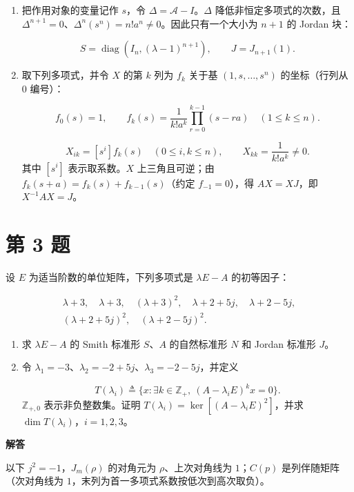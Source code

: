 \documentclass[UTF8,10pt,letterpaper,fontset=fandol]{ctexart}
\begin{document}
\begin{enumerate}
\item 把作用对象的变量记作 $s$，令 $\Delta=\mathcal A-I$。$\Delta$ 降低非恒定多项式的次数，且 $\Delta^{n+1}=0$、$\Delta^n(s^n)=n!a^n\ne0$。因此只有一个大小为 $n+1$ 的 Jordan 块：

\[
\boxed{S=\operatorname{diag}(I_n,(\lambda-1)^{n+1}),\qquad J=J_{n+1}(1)}.
\]

\item 取下列多项式，并令 $X$ 的第 $k$ 列为 $f_k$ 关于基 $(1,s,\ldots,s^n)$ 的坐标（行列从 $0$ 编号）：

\[
f_0(s)=1,\qquad
f_k(s)=\frac{1}{k!a^k}\prod_{r=0}^{k-1}(s-ra)\quad(1\le k\le n).
\]

\[
\boxed{X_{ik}=[s^i]f_k(s)\quad(0\le i,k\le n)},\qquad
X_{kk}=\frac{1}{k!a^k}\ne0.
\]
其中 $[s^i]$ 表示取系数。$X$ 上三角且可逆；由 $f_k(s+a)=f_k(s)+f_{k-1}(s)$（约定 $f_{-1}=0$），得 $AX=XJ$，即 $X^{-1}AX=J$。

\end{enumerate}

\newpage

\section{第 3 题}
设 $E$ 为适当阶数的单位矩阵，下列多项式是 $\lambda E-A$ 的初等因子：

\[
\begin{gathered}
\lambda+3,\quad\lambda+3,\quad(\lambda+3)^2,\quad\lambda+2+5j,\quad\lambda+2-5j,\\
(\lambda+2+5j)^2,\quad(\lambda+2-5j)^2.
\end{gathered}
\]


\begin{enumerate}
\item 求 $\lambda E-A$ 的 Smith 标准形 $S$、$A$ 的自然标准形 $N$ 和 Jordan 标准形 $J$。

\item 令 $\lambda_1=-3$、$\lambda_2=-2+5j$、$\lambda_3=-2-5j$，并定义

\[
T(\lambda_i)\triangleq\{x:\exists k\in\mathbb Z_+,\ (A-\lambda_iE)^kx=0\}.
\]
$\mathbb Z_{+,0}$ 表示非负整数集。证明 $T(\lambda_i)=\ker[(A-\lambda_iE)^2]$，并求 $\dim T(\lambda_i)$，$i=1,2,3$。

\end{enumerate}

\par{}\textbf{解答}\par
以下 $j^2=-1$，$J_m(\rho)$ 的对角元为 $\rho$、上次对角线为 $1$；$C(p)$ 是列伴随矩阵（次对角线为 $1$，末列为首一多项式系数按低次到高次取负）。
\end{document}
